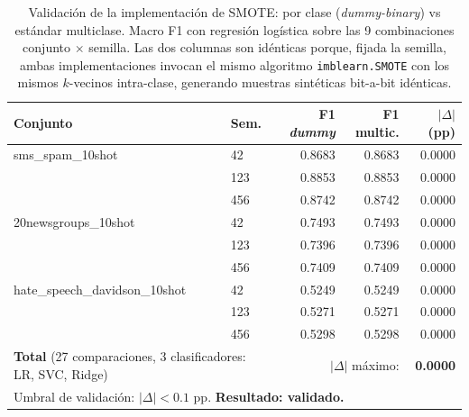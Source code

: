 \begin{table}[htbp]
\centering
\caption{Validación de la implementación de SMOTE: por clase (\textit{dummy-binary}) vs estándar multiclase. Macro F1 con regresión logística sobre las 9 combinaciones conjunto $\times$ semilla. Las dos columnas son idénticas porque, fijada la semilla, ambas implementaciones invocan el mismo algoritmo \texttt{imblearn.SMOTE} con los mismos $k$-vecinos intra-clase, generando muestras sintéticas bit-a-bit idénticas.}
\label{tab:smote_validation}
\small
\setlength{\tabcolsep}{4pt}
\begin{tabular}{llrrr}
\toprule
\textbf{Conjunto} & \textbf{Sem.} & \textbf{F1 \textit{dummy}} & \textbf{F1 multic.} & \textbf{$|\Delta|$ (pp)} \\
\midrule
sms\_spam\_10shot              & 42  & 0.8683 & 0.8683 & 0.0000 \\
                               & 123 & 0.8853 & 0.8853 & 0.0000 \\
                               & 456 & 0.8742 & 0.8742 & 0.0000 \\
\midrule
20newsgroups\_10shot           & 42  & 0.7493 & 0.7493 & 0.0000 \\
                               & 123 & 0.7396 & 0.7396 & 0.0000 \\
                               & 456 & 0.7409 & 0.7409 & 0.0000 \\
\midrule
hate\_speech\_davidson\_10shot & 42  & 0.5249 & 0.5249 & 0.0000 \\
                               & 123 & 0.5271 & 0.5271 & 0.0000 \\
                               & 456 & 0.5298 & 0.5298 & 0.0000 \\
\midrule
\multicolumn{2}{l}{\textbf{Total} (27 comparaciones, 3 clasificadores: LR, SVC, Ridge)} & \multicolumn{2}{r}{$|\Delta|$ máximo:} & \textbf{0.0000} \\
\midrule
\multicolumn{5}{l}{\small Umbral de validación: $|\Delta| < 0.1$ pp. \textbf{Resultado: validado.}} \\
\bottomrule
\end{tabular}
\end{table}
